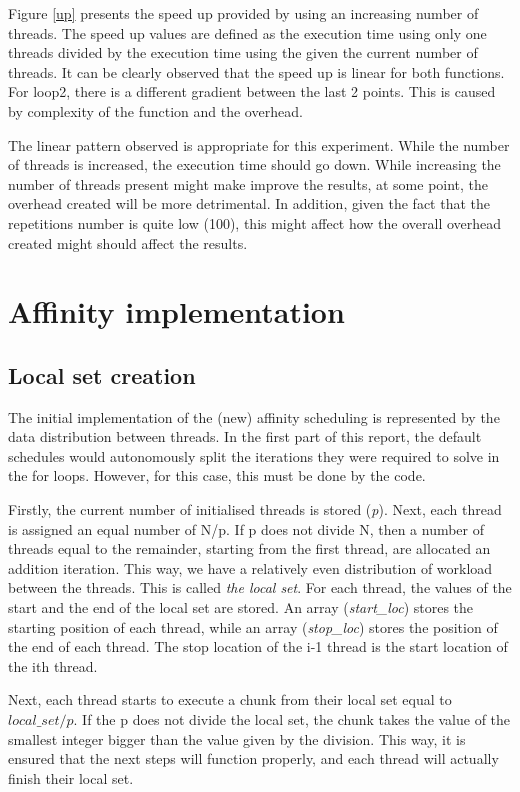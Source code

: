 \documentclass[12pt]{article}
\begin{document}
	Figure \ref{up} presents the speed up provided by using an increasing number of threads. The speed up values are defined as the execution time using only one threads divided by the execution time using the given the current number of threads. It can be clearly observed that the speed up is linear for both functions. For loop2, there is a different gradient between the last 2 points. This is caused by complexity of the function and the overhead. 
	
	The linear pattern observed is appropriate for this experiment. While the number of threads is increased, the execution time should go down. While increasing the number of threads present might make improve the results, at some point, the overhead created will be more detrimental. In addition, given the fact that the repetitions number is quite low (100), this might affect how the overall overhead created might should affect the results. 
	
	\pagebreak
	
	\section{Affinity implementation}
	\subsection{Local set creation}
	The initial implementation of the (new) affinity scheduling is represented by the data distribution between threads. In the first part of this report, the default schedules would autonomously split the iterations they were required to solve in the for loops. However, for this case, this must be done by the code.
	
	Firstly, the current number of initialised threads is stored (\textit{p}). Next, each thread is assigned an equal number of N/p. If p does not divide N, then a number of threads equal to the remainder, starting from the first thread, are allocated an addition iteration. This way, we have a relatively even distribution of workload between the threads. This is called \textit{the local set}.
	For each thread, the values of the start and the end of the local set are stored. An array (\textit{start\_loc}) stores the starting position of each thread, while an array (\textit{stop\_loc}) stores the position of the end of each thread. The stop location of the i-1 thread is the start location of the ith thread.
	
	Next, each thread starts to execute a chunk from their local set equal to $local\_set/p$. If the p does not divide the local set, the chunk takes the value of the smallest integer bigger than the value given by the division. This way, it is ensured that the next steps will function properly, and each thread will actually finish their local set. 
	
\end{document}

